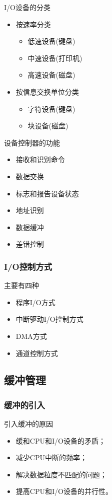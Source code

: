 \documentclass[12pt, a4paper, oneside]{ctexart}
\begin{document}
I/O设备的分类
\begin{itemize}
    \item 按速率分类
    \begin{itemize}
        \item 低速设备(键盘)
        \item 中速设备(打印机)
        \item 高速设备(磁盘)
    \end{itemize}
    \item 按信息交换单位分类
    \begin{itemize}
        \item 字符设备(键盘)
        \item 块设备(磁盘)
    \end{itemize}
\end{itemize}

设备控制器的功能
\begin{itemize}
    \item 接收和识别命令
    \item 数据交换
    \item 标志和报告设备状态
    \item 地址识别
    \item 数据缓冲
    \item 差错控制
\end{itemize}

\subsubsection{I/O控制方式}

主要有四种
\begin{itemize}
    \item 程序I/O方式
    \item 中断驱动I/O控制方式
    \item DMA方式
    \item 通道控制方式
\end{itemize}

\subsection{缓冲管理}

\subsubsection{缓冲的引入}

引入缓冲的原因
\begin{itemize}
    \item 缓和CPU和I/O设备的矛盾；
    \item 减少CPU中断的频率；
    \item 解决数据粒度不匹配的问题；
    \item 提高CPU和I/O设备的并行性。
\end{itemize}
\end{document}
